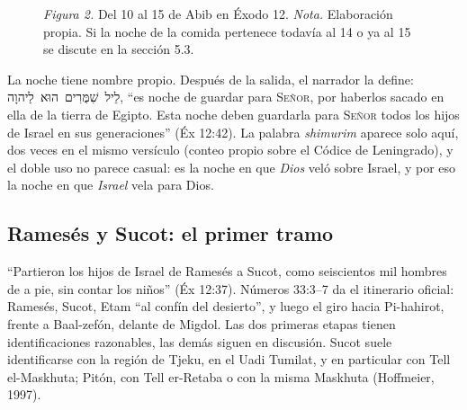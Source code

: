 \documentclass[11pt,letterpaper]{article}
\newcommand{\heb}[1]{\mbox{\foreignlanguage{hebrew}{#1}}}
\newcommand{\SENOR}{\textsc{Señor}}
\begin{document}
\begin{figure}[!htbp]\centering
{}\par
{\footnotesize\color{sepia}\textit{Figura 2.} Del 10 al 15 de Abib en Éxodo 12. \textit{Nota.} Elaboración propia. Si la noche de la comida pertenece todavía al 14 o ya al 15 se discute en la sección 5.3.}
\end{figure}

La noche tiene nombre propio. Después de la salida, el narrador la define: \heb{לֵיל שִׁמֻּרִים הוּא לַיהוָה}, ``es noche de guardar para \SENOR, por haberlos sacado en ella de la tierra de Egipto. Esta noche deben guardarla para \SENOR{} todos los hijos de Israel en sus generaciones'' (Éx 12:42). La palabra \emph{shimurim} aparece solo aquí, dos veces en el mismo versículo (conteo propio sobre el Códice de Leningrado), y el doble uso no parece casual: es la noche en que \emph{Dios} veló sobre Israel, y por eso la noche en que \emph{Israel} vela para Dios.

\subsection{Ramesés y Sucot: el primer tramo}
``Partieron los hijos de Israel de Ramesés a Sucot, como seiscientos mil hombres de a pie, sin contar los niños'' (Éx 12:37). Números 33:3--7 da el itinerario oficial: Ramesés, Sucot, Etam ``al confín del desierto'', y luego el giro hacia Pi-hahirot, frente a Baal-zefón, delante de Migdol. Las dos primeras etapas tienen identificaciones razonables, las demás siguen en discusión. Sucot suele identificarse con la región de Tjeku, en el Uadi Tumilat, y en particular con Tell el-Maskhuta; Pitón, con Tell er-Retaba o con la misma Maskhuta (Hoffmeier, 1997).
\end{document}

